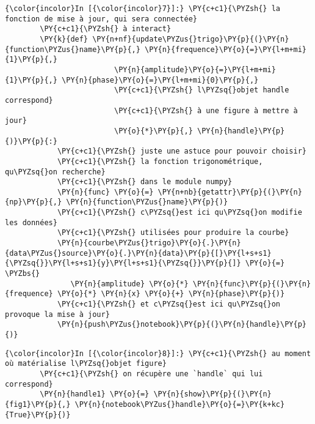     \begin{Verbatim}[commandchars=\\\{\}]
{\color{incolor}In [{\color{incolor}7}]:} \PY{c+c1}{\PYZsh{} la fonction de mise à jour, qui sera connectée}
        \PY{c+c1}{\PYZsh{} à interact}
        \PY{k}{def} \PY{n+nf}{update\PYZus{}trigo}\PY{p}{(}\PY{n}{function\PYZus{}name}\PY{p}{,} \PY{n}{frequence}\PY{o}{=}\PY{l+m+mi}{1}\PY{p}{,}
                         \PY{n}{amplitude}\PY{o}{=}\PY{l+m+mi}{1}\PY{p}{,} \PY{n}{phase}\PY{o}{=}\PY{l+m+mi}{0}\PY{p}{,}
                         \PY{c+c1}{\PYZsh{} l\PYZsq{}objet handle correspond}
                         \PY{c+c1}{\PYZsh{} à une figure à mettre à jour}
                         \PY{o}{*}\PY{p}{,} \PY{n}{handle}\PY{p}{)}\PY{p}{:}
            \PY{c+c1}{\PYZsh{} juste une astuce pour pouvoir choisir}
            \PY{c+c1}{\PYZsh{} la fonction trigonométrique, qu\PYZsq{}on recherche}
            \PY{c+c1}{\PYZsh{} dans le module numpy}
            \PY{n}{func} \PY{o}{=} \PY{n+nb}{getattr}\PY{p}{(}\PY{n}{np}\PY{p}{,} \PY{n}{function\PYZus{}name}\PY{p}{)}
            \PY{c+c1}{\PYZsh{} c\PYZsq{}est ici qu\PYZsq{}on modifie les données}
            \PY{c+c1}{\PYZsh{} utilisées pour produire la courbe}
            \PY{n}{courbe\PYZus{}trigo}\PY{o}{.}\PY{n}{data\PYZus{}source}\PY{o}{.}\PY{n}{data}\PY{p}{[}\PY{l+s+s1}{\PYZsq{}}\PY{l+s+s1}{y}\PY{l+s+s1}{\PYZsq{}}\PY{p}{]} \PY{o}{=} \PYZbs{}
               \PY{n}{amplitude} \PY{o}{*} \PY{n}{func}\PY{p}{(}\PY{n}{frequence} \PY{o}{*} \PY{n}{x} \PY{o}{+} \PY{n}{phase}\PY{p}{)}
            \PY{c+c1}{\PYZsh{} et c\PYZsq{}est ici qu\PYZsq{}on provoque la mise à jour}
            \PY{n}{push\PYZus{}notebook}\PY{p}{(}\PY{n}{handle}\PY{p}{)}
\end{Verbatim}


    \begin{Verbatim}[commandchars=\\\{\}]
{\color{incolor}In [{\color{incolor}8}]:} \PY{c+c1}{\PYZsh{} au moment où matérialise l\PYZsq{}objet figure}
        \PY{c+c1}{\PYZsh{} on récupère une `handle` qui lui correspond}
        \PY{n}{handle1} \PY{o}{=} \PY{n}{show}\PY{p}{(}\PY{n}{fig1}\PY{p}{,} \PY{n}{notebook\PYZus{}handle}\PY{o}{=}\PY{k+kc}{True}\PY{p}{)}
\end{Verbatim}


    
    
    
    

